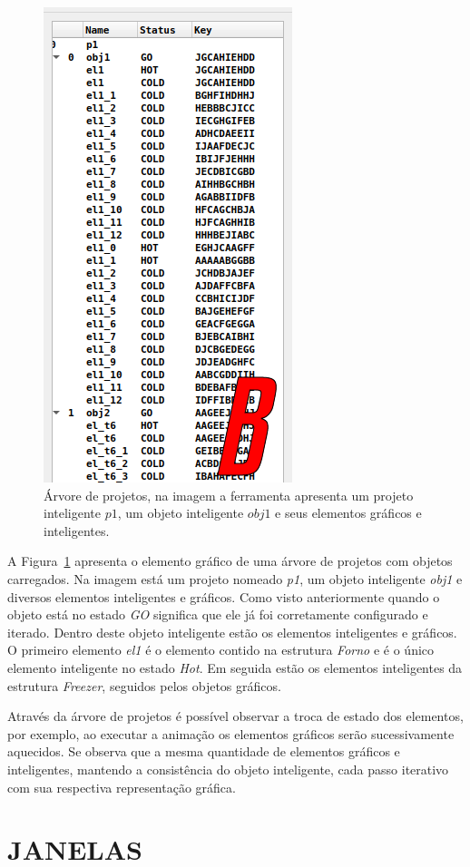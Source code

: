 \begin{figure}[!htbp]
	\centering
	\includegraphics[width=0.4\linewidth]{Figures/IGU_001c.png}
	\caption{Árvore de projetos, na imagem a ferramenta apresenta um projeto inteligente $p1$, um objeto inteligente $obj1$ e seus elementos gráficos e inteligentes.}
	\label{fig:arvores}
\end{figure}

A Figura~\ref{fig:arvores} apresenta o elemento gráfico de uma árvore de projetos com objetos carregados. Na imagem está um projeto nomeado \textit{p1}, um objeto inteligente \textit{obj1} e diversos elementos inteligentes e gráficos. Como visto anteriormente quando o objeto está no estado \textit{GO} significa que ele já foi corretamente configurado e iterado. Dentro deste objeto inteligente estão os elementos inteligentes e gráficos. O primeiro elemento \textit{el1} é o elemento contido na estrutura \textit{Forno} e é o único elemento inteligente no estado \textit{Hot}. Em seguida estão os elementos inteligentes da estrutura \textit{Freezer}, seguidos pelos objetos gráficos.

Através da árvore de projetos é possível observar a troca de estado dos elementos, por exemplo, ao executar a animação os elementos gráficos serão sucessivamente aquecidos. Se observa que a mesma quantidade de elementos gráficos e inteligentes, mantendo a consistência do objeto inteligente, cada passo iterativo com sua respectiva representação gráfica.

\section{JANELAS}\label{sec:janelas}

